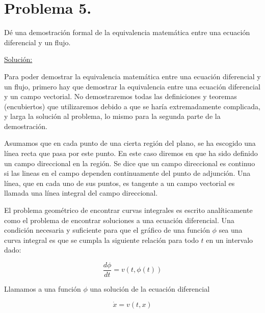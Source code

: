 \documentclass[a4paper,10pt]{article}
\numberwithin{equation}{section}
\begin{document}
\vspace{.3cm}

\section{Problema 5.}
Dé una demostración formal de la equivalencia matemática entre una ecuación
diferencial y un flujo.

\vspace{.3cm}

\underline{Solución:}\vspace{.3cm}

Para poder demostrar la equivalencia matemática entre una ecuación diferencial y un flujo,
primero hay que demostrar la equivalencia entre una ecuación diferencial y un campo vectorial.
No demostraremos todas las definiciones y teoremas (encubiertos) que utilizaremos
debido a que se haría extremadamente complicada, y larga la solución al problema,
lo mismo para la segunda parte de la demostración.

\vspace{.3cm}

Asumamos que en cada punto de una cierta región del plano, se ha escogido una línea
recta que pasa por este punto. En este caso diremos en que ha sido definido un campo
direccional en la región. Se dice que un campo direccional es continuo si las lineas
en el campo dependen continuamente del punto de adjunción. Una línea, que en cada uno
de sus puntos, es tangente a un campo vectorial es llamada una línea integral del
campo direccional.

\vspace{.3cm}

El problema geométrico de encontrar curvas integrales es escrito analíticamente como el
problema de encontrar soluciones a una ecuación diferencial. Una condición necesaria 
y suficiente para que el gráfico de una función $\phi$ sea una curva integral 
es que se cumpla la siguiente relación para todo $t$ en un intervalo dado:

\begin{equation}
 \frac{d\phi}{dt} = v(t,\phi(t))
 \label{eq:pro5e1}
\end{equation}

Llamamos a una función $\phi$ una solución de la ecuación diferencial

\begin{equation}
 \dot{x} = v(t,x)
 \label{eq:pro5e2}
\end{equation}
\end{document}
